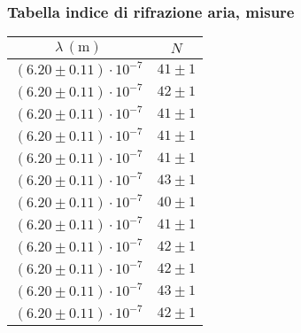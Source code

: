 \subsubsection{Tabella indice di rifrazione aria, misure}
    \begin{table}[H]
    \centering
        \begin{tabular}{|c|c|}
        \hline
        $ \lambda \, (\text{m}) $ & $ N $ \\
        \hline
        $ (6.20 \pm 0.11) \cdot 10^{-7} $ & $ 41 \pm 1 $ \\
        \hline
        $ (6.20 \pm 0.11) \cdot 10^{-7} $ & $ 42 \pm 1 $ \\
        \hline
        $ (6.20 \pm 0.11) \cdot 10^{-7} $ & $ 41 \pm 1 $ \\
        \hline
        $ (6.20 \pm 0.11) \cdot 10^{-7} $ & $ 41 \pm 1 $ \\
        \hline
        $ (6.20 \pm 0.11) \cdot 10^{-7} $ & $ 41 \pm 1 $ \\
        \hline
        $ (6.20 \pm 0.11) \cdot 10^{-7} $ & $ 43 \pm 1 $ \\
        \hline
        $ (6.20 \pm 0.11) \cdot 10^{-7} $ & $ 40 \pm 1 $ \\
        \hline
        $ (6.20 \pm 0.11) \cdot 10^{-7} $ & $ 41 \pm 1 $ \\
        \hline
        $ (6.20 \pm 0.11) \cdot 10^{-7} $ & $ 42 \pm 1 $ \\
        \hline
        $ (6.20 \pm 0.11) \cdot 10^{-7} $ & $ 42 \pm 1 $ \\
        \hline
        $ (6.20 \pm 0.11) \cdot 10^{-7} $ & $ 43 \pm 1 $ \\
        \hline
        $ (6.20 \pm 0.11) \cdot 10^{-7} $ & $ 42 \pm 1 $ \\
        \hline
        \end{tabular}
    \end{table}